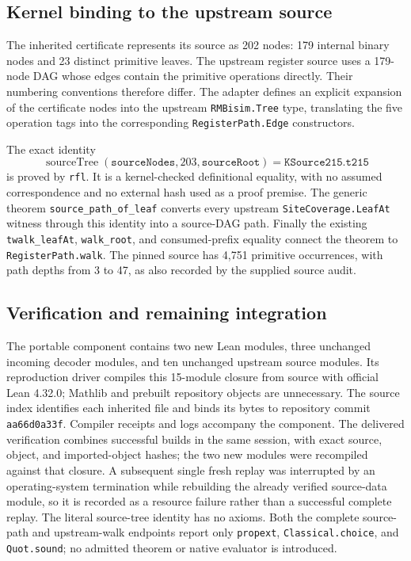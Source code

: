 \subsection{Kernel binding to the upstream source}

The inherited certificate represents its source as 202 nodes: 179 internal
binary nodes and 23 distinct primitive leaves. The upstream register source
uses a 179-node DAG whose edges contain the primitive operations directly.
Their numbering conventions therefore differ. The adapter defines an explicit
expansion of the certificate nodes into the upstream \texttt{RMBisim.Tree}
type, translating the five operation tags into the corresponding
\texttt{RegisterPath.Edge} constructors.

The exact identity
\[
 \operatorname{sourceTree}(\texttt{sourceNodes},203,\texttt{sourceRoot})
   =\texttt{KSource215.t215}
\]
is proved by \texttt{rfl}. It is a kernel-checked definitional equality, with
no assumed correspondence and no external hash used as a proof premise.
The generic theorem \texttt{source\_path\_of\_leaf} converts every
upstream \texttt{SiteCoverage.LeafAt} witness through this identity into a
source-DAG path. Finally the existing \texttt{twalk\_leafAt},
\texttt{walk\_root}, and consumed-prefix equality connect the theorem to
\texttt{RegisterPath.walk}. The pinned source has 4,751 primitive occurrences,
with path depths from 3 to 47, as also recorded by the supplied source audit.

\subsection{Verification and remaining integration}

The portable component contains two new Lean modules, three unchanged
incoming decoder modules, and ten unchanged upstream source modules. Its
reproduction driver compiles this 15-module closure from source with official
Lean 4.32.0; Mathlib and prebuilt repository objects are unnecessary. The
source index identifies each inherited file and binds its bytes to repository
commit \texttt{aa66d0a33f}. Compiler receipts and logs accompany the component. The delivered verification
combines successful builds in the same session, with exact source, object,
and imported-object hashes; the two new modules were recompiled against that
closure. A subsequent single fresh replay was interrupted by an operating-system
termination while rebuilding the already verified source-data module, so it is
recorded as a resource failure rather than a successful complete replay.
The literal source-tree identity has no axioms. Both the complete source-path
and upstream-walk endpoints report only \texttt{propext},
\texttt{Classical.choice}, and \texttt{Quot.sound}; no admitted theorem or
native evaluator is introduced.

